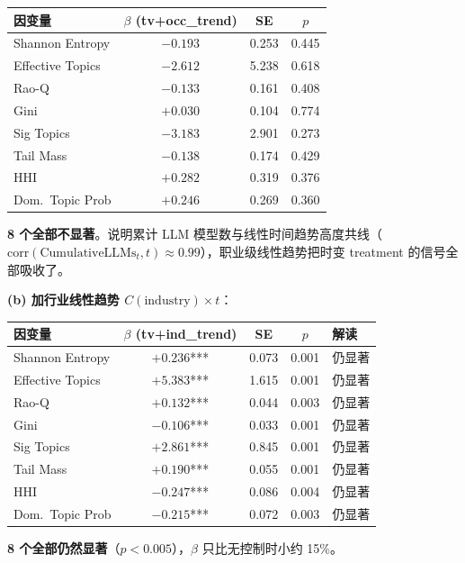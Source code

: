\documentclass[12pt,a4paper]{article}
\begin{document}
\begin{center}
\small
\begin{tabular}{lccc}
\toprule
因变量 & $\beta$ (tv+occ\_trend) & SE & $p$ \\
\midrule
Shannon Entropy & $-0.193$ & 0.253 & 0.445 \\
Effective Topics & $-2.612$ & 5.238 & 0.618 \\
Rao-Q & $-0.133$ & 0.161 & 0.408 \\
Gini & $+0.030$ & 0.104 & 0.774 \\
Sig Topics & $-3.183$ & 2.901 & 0.273 \\
Tail Mass & $-0.138$ & 0.174 & 0.429 \\
HHI & $+0.282$ & 0.319 & 0.376 \\
Dom.\ Topic Prob & $+0.246$ & 0.269 & 0.360 \\
\bottomrule
\end{tabular}
\end{center}

\textbf{8 个全部不显著}。说明累计 LLM 模型数与线性时间趋势高度共线（$\text{corr}(\text{CumulativeLLMs}_t, t) \approx 0.99$），职业级线性趋势把时变 treatment 的信号全部吸收了。

\medskip
\textbf{(b) 加行业线性趋势 $C(\text{industry}) \times t$}：

\begin{center}
\small
\begin{tabular}{lcccp{4cm}}
\toprule
因变量 & $\beta$ (tv+ind\_trend) & SE & $p$ & 解读 \\
\midrule
Shannon Entropy & $+0.236$*** & 0.073 & 0.001 & 仍显著 \\
Effective Topics & $+5.383$*** & 1.615 & 0.001 & 仍显著 \\
Rao-Q & $+0.132$*** & 0.044 & 0.003 & 仍显著 \\
Gini & $-0.106$*** & 0.033 & 0.001 & 仍显著 \\
Sig Topics & $+2.861$*** & 0.845 & 0.001 & 仍显著 \\
Tail Mass & $+0.190$*** & 0.055 & 0.001 & 仍显著 \\
HHI & $-0.247$*** & 0.086 & 0.004 & 仍显著 \\
Dom.\ Topic Prob & $-0.215$*** & 0.072 & 0.003 & 仍显著 \\
\bottomrule
\end{tabular}
\end{center}

\textbf{8 个全部仍然显著}（$p < 0.005$），$\beta$ 只比无控制时小约 15\%。
\end{document}
